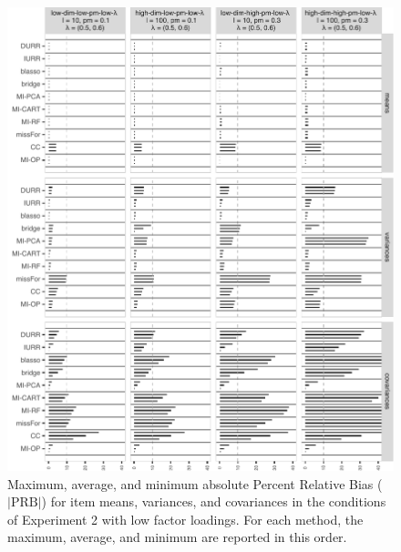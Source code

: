 \begin{figure}
	\includegraphics{../../output/graphs/exp2_semR_bias_58_summy.pdf}
\caption{
	Maximum, average, and minimum absolute Percent Relative Bias ($|\text{PRB}|$) for item means, variances, 
	and covariances in the conditions of Experiment 2 with low factor loadings.
	For each method, the maximum, average, and minimum are reported in this order.	
}
\label{fig:exp2bias58}
\end{figure}

